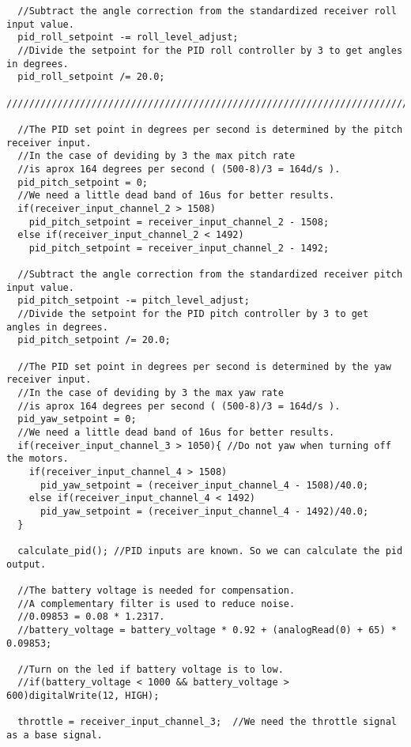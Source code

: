 \begin{lstlisting}
  //Subtract the angle correction from the standardized receiver roll input value.
  pid_roll_setpoint -= roll_level_adjust;
  //Divide the setpoint for the PID roll controller by 3 to get angles in degrees.                                   
  pid_roll_setpoint /= 20.0;                                                 
  //////////////////////////////////////////////////////////////////////////////////////  

  //The PID set point in degrees per second is determined by the pitch receiver input.
  //In the case of deviding by 3 the max pitch rate 
  //is aprox 164 degrees per second ( (500-8)/3 = 164d/s ).
  pid_pitch_setpoint = 0;
  //We need a little dead band of 16us for better results.
  if(receiver_input_channel_2 > 1508)
    pid_pitch_setpoint = receiver_input_channel_2 - 1508;
  else if(receiver_input_channel_2 < 1492)
    pid_pitch_setpoint = receiver_input_channel_2 - 1492;

  //Subtract the angle correction from the standardized receiver pitch input value.
  pid_pitch_setpoint -= pitch_level_adjust;  
  //Divide the setpoint for the PID pitch controller by 3 to get angles in degrees.                                 
  pid_pitch_setpoint /= 20.0;                                                 

  //The PID set point in degrees per second is determined by the yaw receiver input.
  //In the case of deviding by 3 the max yaw rate 
  //is aprox 164 degrees per second ( (500-8)/3 = 164d/s ).
  pid_yaw_setpoint = 0;
  //We need a little dead band of 16us for better results.
  if(receiver_input_channel_3 > 1050){ //Do not yaw when turning off the motors.
    if(receiver_input_channel_4 > 1508)
      pid_yaw_setpoint = (receiver_input_channel_4 - 1508)/40.0;
    else if(receiver_input_channel_4 < 1492)
      pid_yaw_setpoint = (receiver_input_channel_4 - 1492)/40.0;
  }
  
  calculate_pid(); //PID inputs are known. So we can calculate the pid output.

  //The battery voltage is needed for compensation.
  //A complementary filter is used to reduce noise.
  //0.09853 = 0.08 * 1.2317.
  //battery_voltage = battery_voltage * 0.92 + (analogRead(0) + 65) * 0.09853;

  //Turn on the led if battery voltage is to low.
  //if(battery_voltage < 1000 && battery_voltage > 600)digitalWrite(12, HIGH);

  throttle = receiver_input_channel_3;  //We need the throttle signal as a base signal.


\end{lstlisting}
